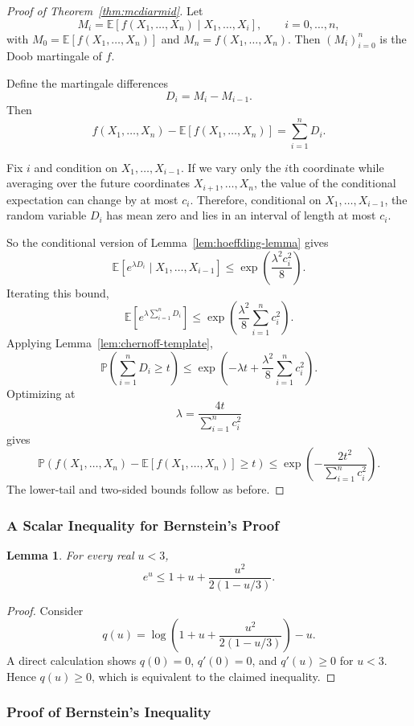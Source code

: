 \documentclass{article}
\newtheorem{lemma}[theorem]{Lemma}
\theoremstyle{definition}
\theoremstyle{remark}
\newcommand{\EE}{\mathbb{E}}
\newcommand{\PP}{\mathbb{P}}
\begin{document}
\begin{proof}[Proof of Theorem~\ref{thm:mcdiarmid}]
Let
$$
M_i = \EE[f(X_1,\dots,X_n)\mid X_1,\dots,X_i],
\qquad i=0,\dots,n,
$$
with $M_0=\EE[f(X_1,\dots,X_n)]$ and $M_n=f(X_1,\dots,X_n)$. Then $(M_i)_{i=0}^n$ is the Doob martingale of $f$.

Define the martingale differences
$$
D_i = M_i - M_{i-1}.
$$
Then
$$
f(X_1,\dots,X_n)-\EE[f(X_1,\dots,X_n)]
=
\sum_{i=1}^n D_i.
$$

Fix $i$ and condition on $X_1,\dots,X_{i-1}$. If we vary only the $i$th coordinate while averaging over the future coordinates $X_{i+1},\dots,X_n$, the value of the conditional expectation can change by at most $c_i$. Therefore, conditional on $X_1,\dots,X_{i-1}$, the random variable $D_i$ has mean zero and lies in an interval of length at most $c_i$.

So the conditional version of Lemma~\ref{lem:hoeffding-lemma} gives
$$
\EE[e^{\lambda D_i}\mid X_1,\dots,X_{i-1}]
\le
\exp\!\left(\frac{\lambda^2 c_i^2}{8}\right).
$$
Iterating this bound,
$$
\EE\!\left[
e^{\lambda \sum_{i=1}^n D_i}
\right]
\le
\exp\!\left(
\frac{\lambda^2}{8}\sum_{i=1}^n c_i^2
\right).
$$
Applying Lemma~\ref{lem:chernoff-template},
$$
\PP\!\left(
\sum_{i=1}^n D_i \ge t
\right)
\le
\exp\!\left(
-\lambda t + \frac{\lambda^2}{8}\sum_{i=1}^n c_i^2
\right).
$$
Optimizing at
$$
\lambda
=
\frac{4t}{\sum_{i=1}^n c_i^2}
$$
gives
$$
\PP\!\left(
f(X_1,\dots,X_n)-\EE[f(X_1,\dots,X_n)] \ge t
\right)
\le
\exp\!\left(
-\frac{2t^2}{\sum_{i=1}^n c_i^2}
\right).
$$
The lower-tail and two-sided bounds follow as before.
\end{proof}

\subsubsection{A Scalar Inequality for Bernstein's Proof}

\begin{lemma}
\label{lem:bernstein-scalar}
For every real $u<3$,
$$
e^u \le 1 + u + \frac{u^2}{2(1-u/3)}.
$$
\end{lemma}

\begin{proof}
Consider
$$
q(u) = \log\!\left(1 + u + \frac{u^2}{2(1-u/3)}\right) - u.
$$
A direct calculation shows $q(0)=0$, $q'(0)=0$, and $q'(u)\ge 0$ for $u<3$. Hence $q(u)\ge 0$, which is equivalent to the claimed inequality.
\end{proof}

\subsubsection{Proof of Bernstein's Inequality}
\end{document}

